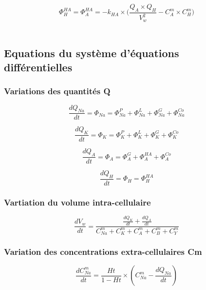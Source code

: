 \documentclass[a4paper,fleqn]{article}
\begin{document}
\begin{equation}
\Phi_{H}^{HA}=\Phi_{A}^{HA}={-k_{HA}}\times{( \frac{{Q_A}\times{Q_H}}{V_w^2} - {C_{A}^{m}}\times{C_{H}^{m}}})
\end{equation}\\

\subsection{Equations du système d'équations différentielles}

\subsubsection*{Variations des quantités Q}

\begin{equation}
\frac{dQ_{Na}}{dt}=\Phi_{Na}=\Phi_{Na}^{P}+\Phi_{Na}^{L}+\Phi_{Na}^{G}+\Phi_{Na}^{Co}
\end{equation}

\begin{equation}
\frac{dQ_K}{dt}=\Phi_{K}=\Phi_{K}^{P}+\Phi_{K}^{L}+\Phi_{K}^{G}+\Phi_{K}^{Co}
\end{equation}

\begin{equation}
\frac{dQ_A}{dt}=\Phi_{A}=\Phi_{A}^{G}+\Phi_{A}^{HA}+\Phi_{A}^{Co}
\end{equation}

\begin{equation}
\frac{dQ_H}{dt}=\Phi_{H}=\Phi_{H}^{HA}
\end{equation}


\subsubsection*{Vartiation du volume intra-cellulaire}

\begin{equation}
\frac{dV_w}{dt}   = \frac{\frac{dQ_K}{dt}+\frac{dQ_A}{dt}}{C_{Na}^{m}+C_{K}^{m}+C_{A}^{m}+C_{B}^{m}+C_{Y}^{m}}
\end{equation}

\subsubsection*{Variation des concentrations extra-cellulaires Cm}

\begin{equation}
\frac{dC_{Na}^m}{dt}={\frac{Ht}{1 - Ht}}\times{\left(C_{Na}^m-\frac{dQ_{Na}}{dt}\right)}
\end{equation}
\end{document}
